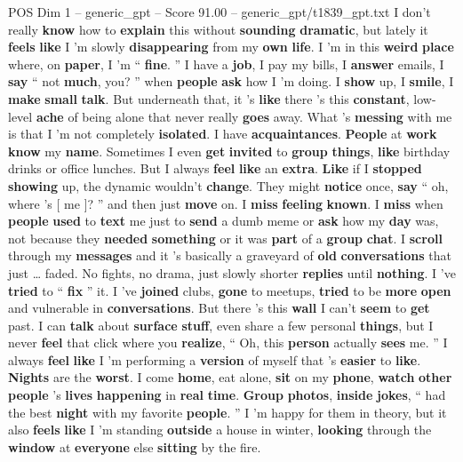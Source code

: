 \begin{textsample}{POS Dim 1 – generic\_gpt – Score 91.00 – generic\_gpt/t1839\_gpt.txt}  \label{ex:f1_pos_001}
I don't really \textbf{know} how to \textbf{explain} this without \textbf{sounding} \textbf{dramatic}, but lately it \textbf{feels} \textbf{like} I ’m slowly \textbf{disappearing} from my \textbf{own} \textbf{life}.
I ’m in this \textbf{weird} \textbf{place} where, on \textbf{paper}, I ’m “ \textbf{fine}. ” I have a \textbf{job}, I pay my bills, I \textbf{answer} emails, I \textbf{say} “ not \textbf{much}, you? ” when \textbf{people} \textbf{ask} how I ’m doing.
I \textbf{show} up, I \textbf{smile}, I \textbf{make} \textbf{small} \textbf{talk}.
But underneath that, it ’s \textbf{like} there ’s this \textbf{constant}, low-level \textbf{ache} of being alone that never really \textbf{goes} away.
What ’s \textbf{messing} with me is that I ’m not completely \textbf{isolated}.
I have \textbf{acquaintances}. \textbf{People} at \textbf{work} \textbf{know} my \textbf{name}.
Sometimes I even \textbf{get} \textbf{invited} to \textbf{group} \textbf{things}, \textbf{like} birthday drinks or office lunches.
But I always \textbf{feel} \textbf{like} an \textbf{extra}. \textbf{Like} if I \textbf{stopped} \textbf{showing} up, the dynamic wouldn't \textbf{change}.
They might \textbf{notice} once, \textbf{say} “ oh, where ’s [ me ]? ” and then just \textbf{move} on.
I \textbf{miss} \textbf{feeling} \textbf{known}.
I \textbf{miss} when \textbf{people} \textbf{used} to \textbf{text} me just to \textbf{send} a dumb meme or \textbf{ask} how my \textbf{day} was, not because they \textbf{needed} \textbf{something} or it was \textbf{part} of a \textbf{group} \textbf{chat}.
I \textbf{scroll} through my \textbf{messages} and it ’s basically a graveyard of \textbf{old} \textbf{conversations} that just … faded.
No fights, no drama, just slowly shorter \textbf{replies} until \textbf{nothing}.
I ’ve \textbf{tried} to “ \textbf{fix} ” it.
I ’ve \textbf{joined} clubs, \textbf{gone} to meetups, \textbf{tried} to be \textbf{more} \textbf{open} and vulnerable in \textbf{conversations}.
But there ’s this \textbf{wall} I can't \textbf{seem} to \textbf{get} past.
I can \textbf{talk} about \textbf{surface} \textbf{stuff}, even share a few personal \textbf{things}, but I never \textbf{feel} that click where you \textbf{realize}, “ Oh, this \textbf{person} actually \textbf{sees} me. ” I always \textbf{feel} \textbf{like} I ’m performing a \textbf{version} of myself that ’s \textbf{easier} to \textbf{like}. \textbf{Nights} are the \textbf{worst}.
I come \textbf{home}, eat alone, \textbf{sit} on my \textbf{phone}, \textbf{watch} \textbf{other} \textbf{people} ’s \textbf{lives} \textbf{happening} in \textbf{real} \textbf{time}. \textbf{Group} \textbf{photos}, \textbf{inside} \textbf{jokes}, “ had the best \textbf{night} with my favorite \textbf{people}. ” I ’m happy for them in theory, but it also \textbf{feels} \textbf{like} I ’m standing \textbf{outside} a house in winter, \textbf{looking} through the \textbf{window} at \textbf{everyone} else \textbf{sitting} by the fire.

\end{textsample}
